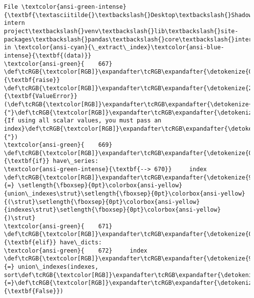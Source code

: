 \documentclass[11pt]{article}
\begin{document}
\begin{Verbatim}[commandchars=\\\{\}, frame=single, framerule=2mm, rulecolor=\color{outerrorbackground}]
File \textcolor{ansi-green-intense}{\textbf{\textasciitilde{}\textbackslash{}Desktop\textbackslash{}Shadowfox intern project\textbackslash{}venv\textbackslash{}lib\textbackslash{}site-packages\textbackslash{}pandas\textbackslash{}core\textbackslash{}internals\textbackslash{}construction.py:670}}, in \textcolor{ansi-cyan}{\_extract\_index}\textcolor{ansi-blue-intense}{\textbf{(data)}}
\textcolor{ansi-green}{    667}     \def\tcRGB{\textcolor[RGB]}\expandafter\tcRGB\expandafter{\detokenize{0,135,0}}{\textbf{raise}} \def\tcRGB{\textcolor[RGB]}\expandafter\tcRGB\expandafter{\detokenize{215,95,95}}{\textbf{ValueError}}(\def\tcRGB{\textcolor[RGB]}\expandafter\tcRGB\expandafter{\detokenize{175,0,0}}{"}\def\tcRGB{\textcolor[RGB]}\expandafter\tcRGB\expandafter{\detokenize{175,0,0}}{If using all scalar values, you must pass an index}\def\tcRGB{\textcolor[RGB]}\expandafter\tcRGB\expandafter{\detokenize{175,0,0}}{"})
\textcolor{ansi-green}{    669} \def\tcRGB{\textcolor[RGB]}\expandafter\tcRGB\expandafter{\detokenize{0,135,0}}{\textbf{if}} have\_series:
\textcolor{ansi-green-intense}{\textbf{--> 670}}     index \def\tcRGB{\textcolor[RGB]}\expandafter\tcRGB\expandafter{\detokenize{98,98,98}}{=} \setlength{\fboxsep}{0pt}\colorbox{ansi-yellow}{union\_indexes\strut}\setlength{\fboxsep}{0pt}\colorbox{ansi-yellow}{(\strut}\setlength{\fboxsep}{0pt}\colorbox{ansi-yellow}{indexes\strut}\setlength{\fboxsep}{0pt}\colorbox{ansi-yellow}{)\strut}
\textcolor{ansi-green}{    671} \def\tcRGB{\textcolor[RGB]}\expandafter\tcRGB\expandafter{\detokenize{0,135,0}}{\textbf{elif}} have\_dicts:
\textcolor{ansi-green}{    672}     index \def\tcRGB{\textcolor[RGB]}\expandafter\tcRGB\expandafter{\detokenize{98,98,98}}{=} union\_indexes(indexes, sort\def\tcRGB{\textcolor[RGB]}\expandafter\tcRGB\expandafter{\detokenize{98,98,98}}{=}\def\tcRGB{\textcolor[RGB]}\expandafter\tcRGB\expandafter{\detokenize{0,135,0}}{\textbf{False}})


\end{Verbatim}
\end{document}
